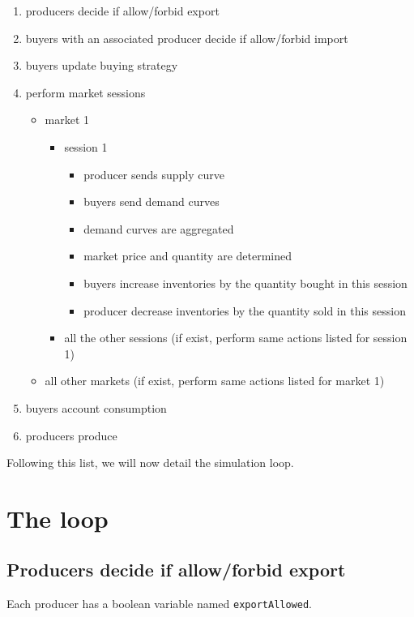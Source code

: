 \documentclass{article}
\begin{document}
\begin{enumerate}
	\item producers decide if allow/forbid export
	\item buyers with an associated producer decide if allow/forbid import
	\item buyers update buying strategy
	\item perform market sessions
		\begin{itemize}
			\item market 1
				\begin{itemize}
				\item session 1 
					\begin{itemize}
						\item producer sends supply curve
						\item buyers send demand curves
						\item demand curves are aggregated 
						\item market price and quantity are determined
						\item buyers increase inventories by the quantity bought in this session
						\item producer decrease inventories by the quantity sold in this session
					\end{itemize}
				\item all the other sessions (if exist, perform same actions listed for session 1)
				\end{itemize}
			\item  all other markets (if exist, perform same actions listed for market 1)
		\end{itemize}
	\item buyers account consumption
	\item producers produce
\end{enumerate}

Following this list, we will now detail the simulation loop. 

\section{The loop}

\subsection{Producers decide if allow/forbid export}

Each producer has a boolean variable named \verb+exportAllowed+. 
\end{document}
